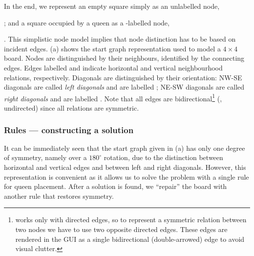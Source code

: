 
In the end, we represent an empty square simply as an unlabelled node,
 ; and a square
occupied by a queen as a -labelled node,
 . This simplistic
node model implies that node distinction has to be based on incident edges.
(a) shows the start graph representation used to model a
$4 \times 4$ board. Nodes are distinguished by their neighbours, identified by
the connecting edges. Edges labelled  and  indicate
horizontal and vertical neighbourhood relations, respectively. Diagonals are
distinguished by their orientation: NW-SE diagonals are called \emph{left
diagonals} and are labelled ; NE-SW diagonals are called \emph{right
diagonals} and are labelled . Note that all edges are
bidirectional\footnote{\GROOVE works only with directed edges, so to represent a
symmetric relation between two nodes we have to use two opposite directed edges.
These edges are rendered in the GUI as a single bidirectional (double-arrowed)
edge to avoid visual clutter.} (\ie, undirected) since all relations are
symmetric.

\subsubsection{Rules --- constructing a solution}

It can be immediately seen that the start graph given in
(a) has only one degree of symmetry, namely over a
$180^\circ$ rotation, due to the distinction between horizontal and vertical
edges and between left and right diagonals. However, this representation is
convenient as it allows us to solve the problem with a single rule for queen
placement. After a solution is found, we ``repair'' the board with another
rule that restores symmetry.

